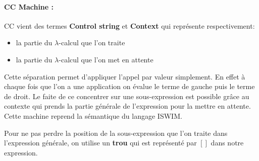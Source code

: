 \documentclass[10pt,a4paper]{report}
\begin{document}
\paragraph{CC Machine :} CC vient des termes \textbf{Control string} et \textbf{Context} qui représente respectivement:
\begin{itemize}
\item la partie du $\lambda$-calcul que l'on traite
\item la partie du $\lambda$-calcul que l'on met en attente 
\end{itemize}
Cette séparation permet d'appliquer l'appel par valeur simplement. En effet à chaque fois que l'on a une application on évalue le terme de gauche puis le terme de droit. Le faite de ce concentrer sur une sous-expression est possible grâce au contexte qui prends la partie générale de l'expression pour la mettre en attente. Cette machine reprend la sémantique du langage ISWIM. 
\medbreak

Pour ne pas perdre la position de la sous-expression que l'on traite dans l'expression générale, on utilise un \textbf{trou} qui est représenté par $[]$ dans notre expression.
\bigbreak
\end{document}
